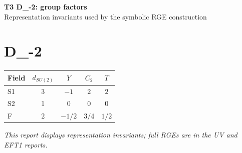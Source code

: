 \documentclass[10pt,a4paper]{article}
\begin{document}
\begin{center}
{\Large\bfseries T3 D\_-2: group factors}\\[4pt]
Representation invariants used by the symbolic RGE construction
\end{center}
\bigskip
\section*{D\_-2}
\begin{longtable}{@{}lcccc@{}}
\toprule Field & $d_{SU(2)}$ & $Y$ & $C_2$ & $T$ \\
\midrule
S1 & 3 & $-1$ & $2$ & $2$ \\
S2 & 1 & $0$ & $0$ & $0$ \\
F & 2 & $-1/2$ & $3/4$ & $1/2$ \\
\bottomrule
\end{longtable}
\emph{This report displays representation invariants; full RGEs are in the UV and EFT1 reports.}
\end{document}
